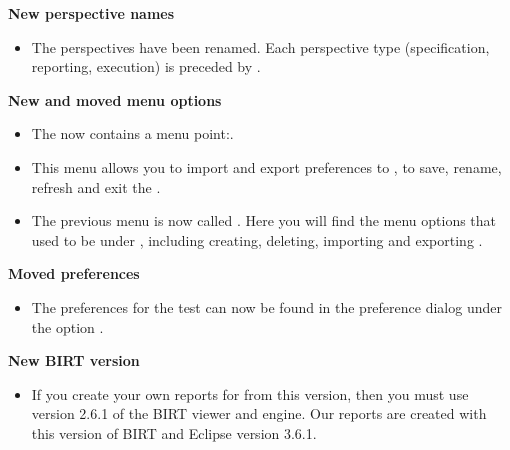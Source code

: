 \textbf{New perspective names}
\begin{itemize}
\item The perspectives have been renamed. Each perspective type (specification, reporting, execution) is preceded by . 
\end{itemize}

\textbf{New and moved menu options}
\begin{itemize}
\item The \ite{} now contains a menu point:.
\item This menu allows you to import and export \gddb{} preferences to \app{}, to save, rename, refresh and exit the \ite{}.
\item The previous  menu is now called . Here you will find the menu options that used to be under , including creating, deleting, importing and exporting \gdprojects{}. 
\end{itemize}

\textbf{Moved preferences}
\begin{itemize}
\item The preferences for the test can now be found in the preference dialog under the option . 
\end{itemize}


\textbf{New BIRT version}
\begin{itemize}
\item If you create your own reports for \app{} from this version, then you must use version 2.6.1 of the BIRT viewer and engine. Our reports are created with this version of BIRT and Eclipse version 3.6.1.
\end{itemize}





